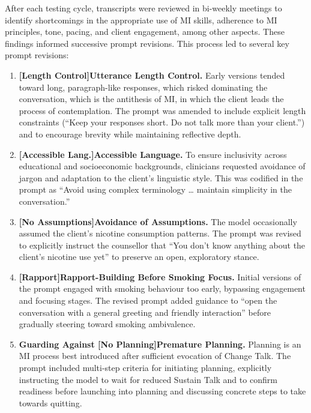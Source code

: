 After each testing cycle, transcripts were reviewed in bi-weekly meetings to identify shortcomings in the appropriate use of MI skills, adherence to MI principles, tone, pacing, and client engagement, among other aspects. These findings informed successive prompt revisions. 
This process led to several key prompt revisions:


\begin{enumerate}
    \item \textbf{[Length Control]Utterance Length Control.} Early versions tended toward long, paragraph-like responses, which risked dominating the conversation, which is the antithesis of MI, in which the client leads the process of contemplation.  The prompt was amended to include explicit length constraints (``Keep your responses short. Do not talk more than your client.'') and to encourage brevity while maintaining reflective depth.

    \item \textbf{[Accessible Lang.]Accessible Language.} To ensure inclusivity across educational and socioeconomic backgrounds, clinicians requested avoidance of jargon and adaptation to the client's linguistic style. This was codified in the prompt as ``Avoid using complex terminology … maintain simplicity in the conversation.''

    \item \textbf{[No Assumptions]Avoidance of Assumptions.} The model occasionally assumed the client's nicotine consumption patterns. The prompt was revised to explicitly instruct the counsellor that ``You don't know anything about the client's nicotine use yet'' to preserve an open, exploratory stance.

    \item \textbf{[Rapport]Rapport-Building Before Smoking Focus.} Initial versions of the prompt engaged with smoking behaviour too early, bypassing engagement and focusing stages. The revised prompt added guidance to ``open the conversation with a general greeting and friendly interaction'' before gradually steering toward smoking ambivalence.

    \item \textbf{Guarding Against [No Planning]Premature Planning.} Planning is an MI process best introduced after sufficient evocation of Change Talk. The prompt included multi-step criteria for initiating planning, explicitly instructing the model to wait for reduced Sustain Talk and to confirm readiness before launching into planning and discussing concrete steps to take towards quitting.

    
\end{enumerate}



